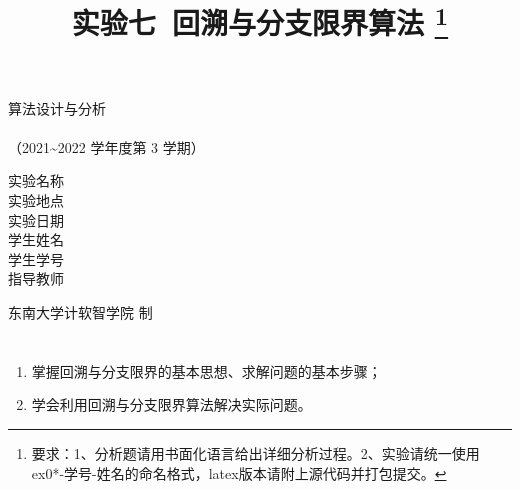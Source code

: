 \documentclass[12pt,a4paper]{ctexart}
\begin{document}
    \begin{titlepage}
        \heiti
        \vspace*{64pt}
        \begin{center}
            \fontsize{48pt}{0} 算法设计与分析\\
            \vspace*{36pt}
            \\
            \vspace*{48pt}
            \LARGE（2021\~{}2022 学年度\qquad 第 3 学期）\\
            \vspace*{48pt}
        
            \LARGE 实验名称\ \ \underline{\makebox[200pt]{\ExamTitle}}\\
            \LARGE 实验地点\ \ \underline{\makebox[200pt]{\ExamAddr}}\\
            \LARGE 实验日期\ \ \underline{\makebox[200pt]{\today}}\\
            \LARGE 学生姓名\ \ \underline{\makebox[200pt]{\MyName}}\\
            \LARGE 学生学号\ \ \underline{\makebox[200pt]{\MySID}}\\
            \LARGE 指导教师\ \ \underline{\makebox[200pt]{\TeacherName}}\\
            \vspace*{48pt}
            
            \LARGE 东南大学\quad  计软智学院 \quad 制
        \end{center}
    \end{titlepage}

\title{
  {\heiti \textbf{实验七\ 回溯与分支限界算法}
    \footnote{要求：1、分析题请用书面化语言给出详细分析过程。2、实验请统一使用ex0*-学号-姓名的命名格式，latex版本请附上源代码并打包提交。}
    }
}
\date{}

\maketitle

\section*{\bf \color{black}{一、实验目的及意义}}
\noindent
\begin{enumerate}
	\item[(1)]  掌握回溯与分支限界的基本思想、求解问题的基本步骤；
	\item[(2)]  学会利用回溯与分支限界算法解决实际问题。
\end{enumerate}
\end{document}
